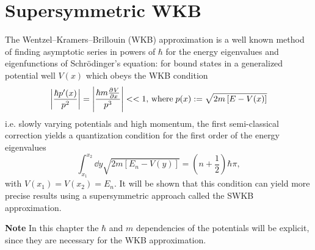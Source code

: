 \thispagestyle{empty}
\chapter{Supersymmetric WKB}
The Wentzel–Kramers–Brillouin (WKB) approximation is a well known method of finding
asymptotic series in powers of $\hbar$ for the energy eigenvalues and eigenfunctions
of Schrödinger's equation: for bound states in a generalized potential well $V(x)$
which obeys the WKB condition
$$\left|\frac{\hbar p'(x)}{p^2}\right| =
\left|\frac{\hbar m\pdv[]{V}{x}}{p^3}\right|<<1\text{, where}
\; p(x):=\sqrt{2m\left[E-V(x)\right]}$$
i.e. slowly varying potentials and high momentum, the first semi-classical
correction yields a quantization condition for the first order of the energy
eigenvalues
\begin{equation}
\int_{x_1}^{x_2}\dd y \sqrt{2m\left[E_n-V(y)\right]}=\left(n+\frac{1}{2}\right)
\hbar\pi,
\label{eq:WKB_quant}
\end{equation}
with $V(x_1) = V(x_2) = E_n$.
It will be shown that this condition can yield more precise results using a
supersymmetric approach called the SWKB approximation.

\textbf{Note} In this chapter the $\hbar$ and $m$ dependencies of the potentials
will be explicit, since they are necessary for the WKB approximation.
